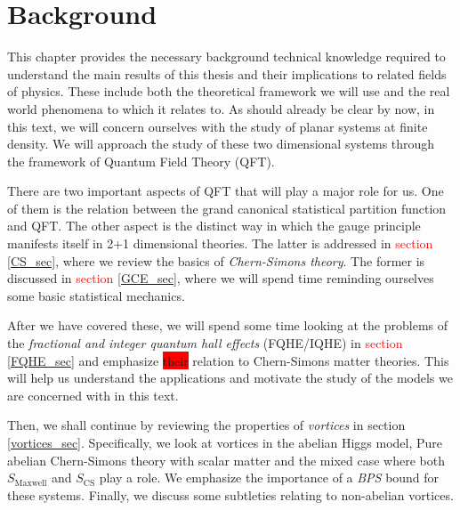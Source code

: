 
    \graphicspath{{Background_Folder/figures/PNG/}{Background_Folder/figures/PDF/}{Background_Folder/figures/}}

\chapter{Background}
        This chapter provides the necessary background technical knowledge required to understand the main results of this thesis and their implications to related fields of physics. These include both the theoretical framework we will use and the real world phenomena to which it relates to. As should already be clear by now, in this text, we will concern ourselves with the study of planar systems at finite density. We will approach the study of these two dimensional systems through the framework of Quantum Field Theory (QFT). 

    There are two important aspects of QFT that will play a major role for us. One of them is the relation between the grand canonical statistical partition function and QFT. The other aspect is the distinct way in which the gauge principle manifests itself in 2+1 dimensional theories. The latter is addressed in \textcolor{red}{section} \ref{CS_sec}, where we review the basics of \textit{Chern-Simons theory}. The former is discussed in \textcolor{red}{section} \ref{GCE_sec}, where we will spend time reminding ourselves some basic statistical mechanics. 


    After we have covered these, \colorbox{red}{ }we will spend some time looking at the problems of the \textit{fractional and integer quantum hall effects} (FQHE/IQHE) in \textcolor{red}{section} \ref{FQHE_sec} and emphasize \colorbox{red}{their} relation to Chern-Simons matter theories. This will help us understand the applications and motivate the study of the models we are concerned with in this text.

    Then, we shall continue by reviewing the properties of \textit{vortices} in section \ref{vortices_sec}. Specifically, we look at vortices in the abelian Higgs model, Pure abelian Chern-Simons theory with scalar matter and the mixed case where both $S_{\text{Maxwell}}$ and $S_{\text{CS}}$ play a role. We emphasize the importance of a \textit{BPS} bound for these systems. Finally, we discuss some subtleties relating to non-abelian vortices.

